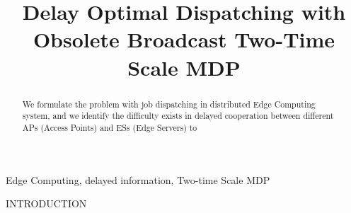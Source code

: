 \documentclass[10pt, conference, letterpaper]{IEEEtran}
\begin{document}
    \title{
        Delay Optimal Dispatching with Obsolete Broadcast Two-Time Scale MDP
    }
    \author{
    }
    \maketitle

    \begin{abstract}
        \label{sec:abstract}
        We formulate the problem with job dispatching in distributed Edge Computing system, and we identify the difficulty exists in delayed cooperation between different APs (Access Points) and ESs (Edge Servers) to 
    \end{abstract}

    \begin{IEEEkeywords}
        Edge Computing, delayed information, Two-time Scale MDP
    \end{IEEEkeywords}

    \begin{section}{INTRODUCTION}
        \label{sec:introduction}
        \cite{sutton1998introduction}
    \end{section}

\end{document}
